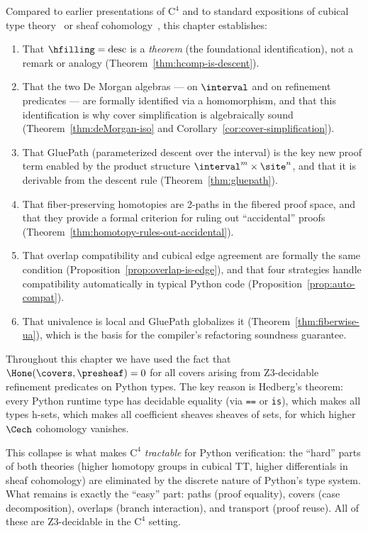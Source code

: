 \begin{remark}
Compared to earlier presentations of $\mathrm{C}^4$ and to standard
expositions of cubical type theory~\cite{cohen2018} or sheaf
cohomology~\cite{kashiwara2006}, this chapter establishes:
\begin{enumerate}
\item That $\hfilling = \mathrm{desc}$ is a \emph{theorem} (the
  foundational identification), not a remark or analogy
  (Theorem~\ref{thm:hcomp-is-descent}).

\item That the two De Morgan algebras --- on $\interval$ and on refinement
  predicates --- are formally identified via a homomorphism, and that
  this identification is why cover simplification is algebraically sound
  (Theorem~\ref{thm:deMorgan-iso} and
  Corollary~\ref{cor:cover-simplification}).

\item That GluePath (parameterized descent over the interval) is the
  key new proof term enabled by the product structure $\interval^m
  \times \site^n$, and that it is derivable from the descent rule
  (Theorem~\ref{thm:gluepath}).

\item That fiber-preserving homotopies are 2-paths in the fibered proof
  space, and that they provide a formal criterion for ruling out
  ``accidental'' proofs (Theorem~\ref{thm:homotopy-rules-out-accidental}).

\item That overlap compatibility and cubical edge agreement are formally
  the same condition (Proposition~\ref{prop:overlap-is-edge}), and that
  four strategies handle compatibility automatically in typical Python
  code (Proposition~\ref{prop:auto-compat}).

\item That univalence is local and GluePath globalizes it
  (Theorem~\ref{thm:fiberwise-ua}), which is the basis for the
  compiler's refactoring soundness guarantee.
\end{enumerate}
\end{remark}

\begin{remark}
Throughout this chapter we have used the fact that $\Hone(\covers,
\presheaf) = 0$ for all covers arising from Z3-decidable refinement
predicates on Python types.  The key reason is Hedberg's theorem:
every Python runtime type has decidable equality (via \texttt{==} or
\texttt{is}), which makes all types h-sets, which makes all coefficient
sheaves sheaves of sets, for which higher $\Cech$ cohomology vanishes.

This collapse is what makes $\mathrm{C}^4$ \emph{tractable} for Python
verification: the ``hard'' parts of both theories (higher homotopy groups
in cubical TT, higher differentials in sheaf cohomology) are eliminated
by the discrete nature of Python's type system.  What remains is exactly
the ``easy'' part: paths (proof equality), covers (case decomposition),
overlaps (branch interaction), and transport (proof reuse).  All of
these are Z3-decidable in the $\mathrm{C}^4$ setting.
\end{remark}
